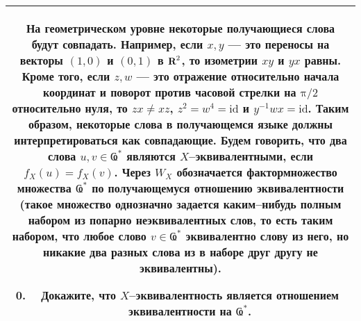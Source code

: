 \begin{center}
\begin{tabular}{|c|}
\hline
	\begin{minipage}{0.85\textwidth}
\medskip
На геометрическом уровне некоторые получающиеся слова будут совпадать. Например, если $x,y$ --- это переносы на векторы $(1,0)$ и $(0,1)$ в $\text{\bfseries R}^2$, то изометрии $xy$ и $yx$ равны. Кроме того, если $z,w$ --- это отражение относительно начала координат и поворот против часовой стрелки на $\text{π}/2$ относительно нуля, то $zx \neq xz$, $z^2 = w^4 = \textrm{id}$ и $y^{-1}wx = \textrm{id}$. Таким образом, некоторые слова в получающемся языке должны интерпретироваться как совпадающие. Будем говорить, что два слова $u,v \in \text{Ҩ}^*$ являются $X$--эквивалентными, если $f_X(u)=f_X(v)$. Через $W_X$ обозначается фактормножество множества $\text{Ҩ}^*$ по получающемуся отношению эквивалентности (такое множество однозначно задается каким--нибудь полным набором из попарно неэквивалентных слов, то есть таким набором, что любое слово $v \in \text{Ҩ}^*$ эквивалентно слову из него, но никакие два разных слова из в наборе друг другу не эквивалентны).
\begin{enumerate} \setcounter{enumi}{-1}
\item Докажите, что $X$--эквивалентность является отношением эквивалентности на $\text{Ҩ}^*$.
\end{enumerate} \smallskip
	\end{minipage} \\
\hline
\end{tabular}
\end{center} \vspace{0.8cm}


